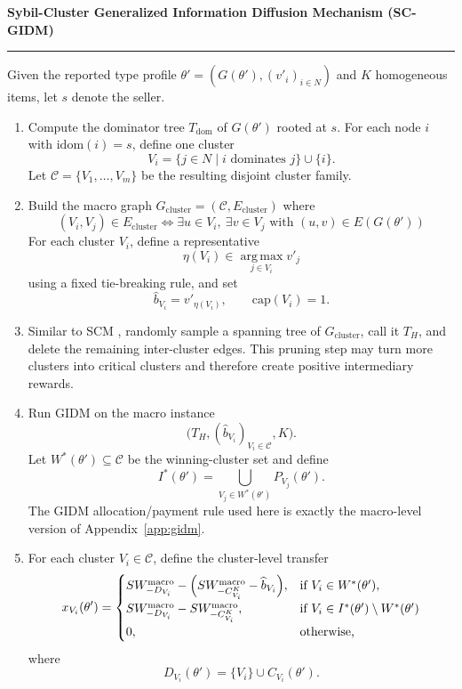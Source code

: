 \documentclass[sigconf]{aamas}
\theoremstyle{definition}
\theoremstyle{remark}
\newcommand{\argmax}{\operatorname*{arg\,max}}
\begin{document}
\begin{framed}
\noindent\textbf{Sybil-Cluster Generalized Information Diffusion Mechanism (SC-GIDM)}\\
\rule{\linewidth}{0.5pt}
Given the reported type profile $\theta'=(G(\theta'),(v'_i)_{i\in N})$ and $K$ homogeneous items, let $s$ denote the seller.

\begin{enumerate}[leftmargin=1.5em]
  \item Compute the dominator tree $T_{\mathrm{dom}}$ of $G(\theta')$ rooted at $s$. For each node $i$ with $\mathrm{idom}(i)=s$, define one cluster
  \[
  V_i=\{j\in N \mid i \text{ dominates } j\}\cup\{i\}.
  \]
  Let $\mathcal{C}=\{V_1,\dots,V_m\}$ be the resulting disjoint cluster family.

  \item Build the macro graph $G_{\mathrm{cluster}}=(\mathcal{C},E_{\mathrm{cluster}})$ where
  \[
  (V_i,V_j)\in E_{\mathrm{cluster}}
  \iff
  \exists u\in V_i,\ \exists v\in V_j \text{ with } (u,v)\in E(G(\theta'))
  \]
  For each cluster $V_i$, define a representative
  \[
  \eta(V_i)\in\argmax_{j\in V_i} v'_j
  \]
  using a fixed tie-breaking rule, and set
  \[
  \widehat b_{V_i}=v'_{\eta(V_i)},\qquad \mathrm{cap}(V_i)=1.
  \]

  \item Similar to SCM \cite{ChenDWWZ23}, randomly sample a spanning tree of $G_{\mathrm{cluster}}$, call it $T_H$, and delete the remaining inter-cluster edges. This pruning step may turn more clusters into critical clusters and therefore create positive intermediary rewards. 

  \item Run GIDM on the macro instance
  \[
  \bigl(T_H,(\widehat b_{V_i})_{V_i\in\mathcal{C}},K\bigr).
  \]
  Let $W^*(\theta')\subseteq\mathcal{C}$ be the winning-cluster set and define
  \[
  I^*(\theta')=\bigcup_{V_j\in W^*(\theta')} P_{V_j}(\theta').
  \]
  The GIDM allocation/payment rule used here is exactly the macro-level version of Appendix~\ref{app:gidm}.

  \item For each cluster $V_i\in\mathcal{C}$, define the cluster-level transfer
  \[
  x_{V_i}(\theta')=
  \begin{cases}
  SW^{\mathrm{macro}}_{-D_{V_i}}-\Bigl(SW^{\mathrm{macro}}_{-C^K_{V_i}}-\widehat b_{V_i}\Bigr),
  & \text{if } V_i\in W^*(\theta'),\\[1ex]
  SW^{\mathrm{macro}}_{-D_{V_i}}-SW^{\mathrm{macro}}_{-C^K_{V_i}},
  & \text{if } V_i\in I^*(\theta')\setminus  W^*(\theta')\\[1ex]
  0,
  & \text{otherwise,}
  \end{cases}
  \]
  where
  \[
  D_{V_i}(\theta')=\{V_i\}\cup C_{V_i}(\theta').
  \]


\end{enumerate}
\end{framed}
\end{document}
